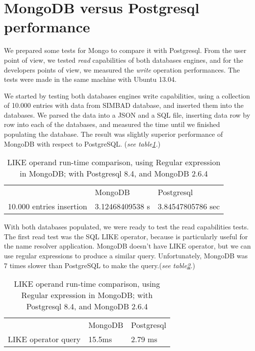\documentclass[11pt,twoside]{article}
\begin{document}
\section{MongoDB versus Postgresql performance}
    We prepared some tests for Mongo to compare it with Postgresql. From the user
    point of view, we tested \emph{read} capabilities of both databases engines, and
    for the developers points of view, we measured the \emph{write} operation
    performances. The tests were made in the same machine with Ubuntu 13.04.
    
    We started by testing both databases engines write capabilities, using a collection of 10.000 entries with data from SIMBAD database,
    and inserted them into the databases. We parsed the data into a JSON and a SQL file, 
    inserting data row by row into each of the databases, and measured the time until we 
    finished populating the database. The result was slightly superior
    performance of MongoDB with respect to PostgreSQL. (\emph{see table\ref{table:insert}.})
  
 \begin{table}
      \centering
    \begin{tabular}{lll}    
                        & MongoDB & Postgresql \\
    10.000 entries insertion & 3.12468409538 s  & 3.84547805786 sec
    \end{tabular}
    \caption{LIKE operand run-time comparison, using Regular expression in MongoDB; with Postgresql 8.4, and MongoDB 2.6.4}
    \label{table:insert}
 \end{table}

    With both databases populated, we were ready to test the read capabilities tests.
    The first read test was the SQL LIKE operator, because is particularly
    useful for the name resolver application. 
    MongoDB doesn't have LIKE operator, but we can use regular expressions to
    produce a similar query. Unfortunately, MongoDB was 7 times slower than
    PostgreSQL to make the query.(\emph{see table\ref{table:like}.})
\begin{table}
\centering
    \begin{tabular}{lll}    
                        & MongoDB & Postgresql \\
    LIKE operator query & 15.5ms  & 2.79 ms
    \end{tabular}
    \caption{LIKE operand run-time comparison, using Regular expression in MongoDB; with Postgresql 8.4, and MongoDB 2.6.4}
    \label{table:like}
\end{table}
\end{document}
